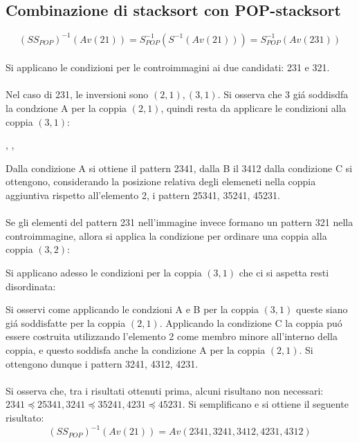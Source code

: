 \subsection*{Combinazione di {stacksort} con {POP-stacksort}}
$$(S{S_{POP}})^{-1}(Av(21)) = S_{POP}^{-1}(S^{-1}(Av(21))) = S_{POP}^{-1}(Av(231))$$
\\Si applicano le condizioni per le controimmagini ai due candidati: 231 e 321.\\\\
Nel caso di 231, le inversioni sono $(2,1),(3,1)$. Si osserva che 3 gi\'a soddisdfa la condzione A per la coppia $(2,1)$, quindi resta da applicare le condizioni alla coppia $(3,1)$:
\begin{center}
,
,
\end{center}
Dalla condizione A si ottiene il pattern 2341, dalla B il 3412 dalla condizione C si ottengono, considerando la posizione relativa degli elemeneti nella coppia aggiuntiva rispetto all'elemento 2, i pattern 25341, 35241, 45231.\\\\
Se gli elementi del pattern 231 nell'immagine invece formano un pattern 321 nella controimmagine, allora si applica la condizione per ordinare una coppia alla coppia $(3,2)$:
\begin{center}
\end{center}
Si applicano adesso le condizioni per la coppia $(3,1)$ che ci si aspetta resti disordinata:
\begin{center}
\end{center}
Si osservi come applicando le condzioni A e B per la coppia $(3,1)$ queste siano gi\'a soddisfatte per la coppia $(2,1)$. Applicando la condizione C la coppia pu\'o essere costruita utilizzando l'elemento 2 come membro minore all'interno della coppia, e questo soddisfa anche la condizione A per la coppia $(2,1)$. Si ottengono dunque i pattern 3241, 4312, 4231.\\\\
Si osserva che, tra i risultati ottenuti prima, alcuni risultano non necessari: $2341\preceq25341, 3241\preceq35241, 4231\preceq45231$. Si semplificano e si ottiene il seguente risultato:
$$(S{S_{POP}})^{-1}(Av(21)) = Av(2341, 3241, 3412, 4231, 4312)$$
